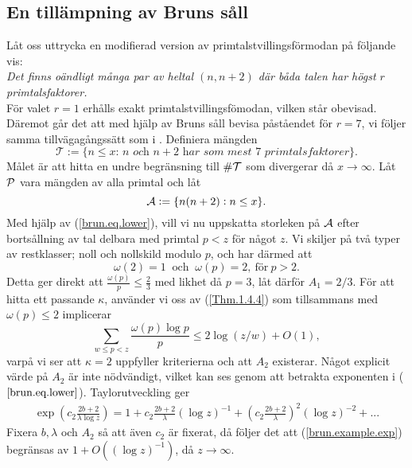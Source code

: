 \subsection{En tillämpning av Bruns såll}
Låt oss uttrycka en modifierad version av primtalstvillingsförmodan på följande vis:\\
\textit{Det finns oändligt många par av heltal $(n,n+2)$ där båda talen har högst $r$ primtalsfaktorer.}\\
För valet $r=1$ erhålls exakt primtalstvillingsfömodan, vilken står obevisad.
Däremot går det att med hjälp av Bruns såll bevisa påståendet för $r=7$, vi följer samma tillvägagångssätt som i \cite[Kap. 6.2]{cojocarumurty}.
Definiera mängden
\begin{equation*}
    \mathcal{T} := \{\textit{$n\leq x$: $n$ och $n+2$ har som mest $7$ primtalsfaktorer}\}.
\end{equation*}
Målet är att hitta en undre begränsning till $\card{\mathcal{T}}$ som divergerar då $x\to\infty$.
Låt $\P$ vara mängden av alla primtal och låt
\begin{equation*}
    \A := \{n(n+2): n\leq x\}.
\end{equation*}
Med hjälp av (\ref{brun.eq.lower}), vill vi nu uppskatta storleken på $\A$ efter bortsållning av tal delbara med primtal $p<z$ för något $z$.
Vi skiljer på två typer av restklasser; noll och nollskild modulo $p$, och har därmed att
\begin{equation*}
    \omega(2)=1\ \text{ och }\ \omega(p)=2,\ \text{för}\ p>2.
\end{equation*}
Detta ger direkt att $\frac{\omega(p)}{p}\leq\frac{2}{3}$ med likhet då $p=3$, låt därför $A_1=2/3$.
För att hitta ett passande $\kappa$, använder vi oss av (\ref{Thm.1.4.4}) som tillsammans med $\omega(p)\leq2$ implicerar
\begin{equation*}
    \sum_{w\leq p<z} \frac{\omega(p)\log p}{p} \leq 2\log\left(z/w\right) + O(1),
\end{equation*}
varpå vi ser att $\kappa=2$ uppfyller kriterierna och att $A_2$ existerar.
Något explicit värde på $A_2$ är inte nödvändigt, vilket kan ses genom att betrakta exponenten i ($\ref{brun.eq.lower}$). Taylorutveckling ger
\begin{align}\label{brun.example.exp}
    \exp\left(c_2\frac{2b+2}{\lambda\log z}\right) = 1 + c_2\frac{2b+2}{\lambda}(\log z)^{-1} + \left(c_2\frac{2b+2}{\lambda}\right)^2(\log z)^{-2} + ...
\end{align}
Fixera $b,\lambda$ och $A_2$ så att även $c_2$ är fixerat, då följer det att (\ref{brun.example.exp}) begränsas av $1+O((\log z)^{-1})$, då $z\to\infty$.
